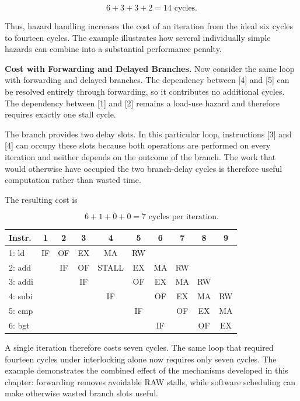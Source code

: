 \documentclass[11pt,a4paper]{report}
\begin{document}
\begin{equation}
6 + 3 + 3 + 2 = 14 \text{ cycles.}
\end{equation}

Thus, hazard handling increases the cost of an iteration from the ideal six cycles to fourteen cycles. The example illustrates how several individually simple hazards can combine into a substantial performance penalty.

\textbf{Cost with Forwarding and Delayed Branches.} Now consider the same loop with forwarding and delayed branches. The dependency between [4] and [5] can be resolved entirely through forwarding, so it contributes no additional cycles. The dependency between [1] and [2] remains a load-use hazard and therefore requires exactly one stall cycle.

The branch provides two delay slots. In this particular loop, instructions [3] and [4] can occupy these slots because both operations are performed on every iteration and neither depends on the outcome of the branch. The work that would otherwise have occupied the two branch-delay cycles is therefore useful computation rather than wasted time.

The resulting cost is

\begin{equation}
6 + 1 + 0 + 0 = 7 \text{ cycles per iteration.}
\end{equation}

\begin{center}
\begin{tabular}{lccccccccc}
\toprule
Instr. & 1 & 2 & 3 & 4 & 5 & 6 & 7 & 8 & 9 \\
\midrule
1: ld & IF & OF & EX & MA & RW & & & & \\
2: add & & IF & OF & STALL & EX & MA & RW & & \\
3: addi & & & IF & & OF & EX & MA & RW & \\
4: subi & & & & IF & & OF & EX & MA & RW \\
5: cmp & & & & & IF & & OF & EX & MA \\
6: bgt & & & & & & IF & & OF & EX \\
\bottomrule
\end{tabular}
\end{center}

A single iteration therefore costs seven cycles. The same loop that required fourteen cycles under interlocking alone now requires only seven cycles. The example demonstrates the combined effect of the mechanisms developed in this chapter: forwarding removes avoidable RAW stalls, while software scheduling can make otherwise wasted branch slots useful.
\end{document}
